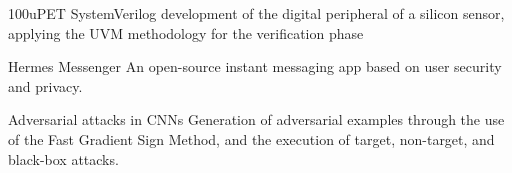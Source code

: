 

\begin{cvskills}

  \cvskill
    {100uPET} %
    {SystemVerilog development of the digital peripheral of a silicon sensor, applying the UVM methodology \newline for the verification phase} %

  \cvskill
    {Hermes Messenger} %
    {An open-source instant messaging app based on user security and privacy.} %

  \cvskill
    {Adversarial attacks in CNNs} %
    {Generation of adversarial examples through the use of the Fast Gradient Sign Method, and the execution \newline of target, non-target, and black-box attacks.} %

\end{cvskills}
